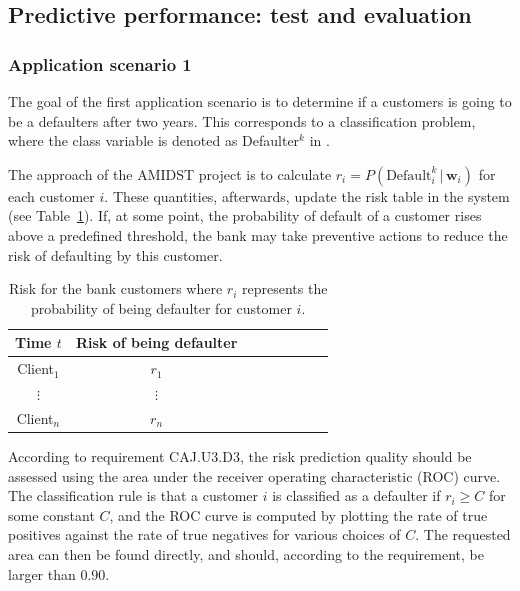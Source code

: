 \documentclass{article}
\theoremstyle{theorem}
\theoremstyle{definition}
\newcommand{\w}{\mathbf{w}}
\begin{document}
\subsection{Predictive performance: test and evaluation}


\subsubsection{Application scenario 1}

The goal of the first application scenario is to determine if a customers is going to be a defaulters after two years. This corresponds to a classification problem, where the class variable is denoted as Defaulter$^k$ in . 

The approach of the AMIDST project is to calculate $r_i=P(\mbox{Default}_i^k \,|\, \w_i)$ for each customer $i$. These quantities, afterwards, update the risk table in the system (see Table~\ref{tab:riskTable}).
If, at some point, the probability of default of a customer rises above a predefined threshold, the bank may take preventive actions to reduce the risk of defaulting by this customer.

\begin{table}[ht!]
\centering
\begin{tabular}{c|ccc|ccc|c}
     Time $t$  & Risk of being defaulter \\  
\hline
Client$_1$  &    $r_1$  \\ 
$\vdots$      &   $\vdots$   \\ 
Client$_n$  &   $r_n$  \\ 
\end{tabular} 
\caption{Risk for the bank customers where $r_i$ represents the probability of being defaulter for customer $i$.}
\label{tab:riskTable}
\end{table}



According to requirement CAJ.U3.D3, the risk prediction quality should be assessed using the area under the receiver operating characteristic (ROC) curve. 
The classification rule is that a customer $i$ is classified as a defaulter if $r_i \geq C$ for some constant $C$, and the ROC curve is computed by  plotting the rate of true positives against the rate of true negatives for various choices of $C$.  The requested area can then be found directly, and should, according to the requirement, be larger than $0.90$. 
\end{document}
